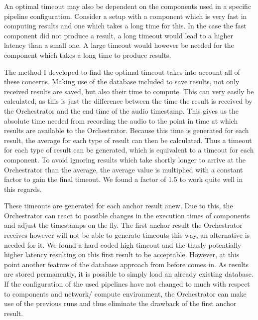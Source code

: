 An optimal timeout may also be dependent on the components used in a specific pipeline configuration.
Consider a setup with a component which is very fast in computing results and one which takes a long time for this.
In the case the fast component did not produce a result, a long timeout would lead to a higher latency than a small one.
A large timeout would however be needed for the component which takes a long time to produce results.

The method I developed to find the optimal timeout takes into account all of these concerns.
Making use of the database included to save results, not only received results are saved, but also their time to compute.
This can very easily be calculated, as this is just the difference between the time the result is received by the Orchestrator and the end time of the audio timestamp.
This gives us the absolute time needed from recording the audio to the point in time at which results are available to the Orchestrator.
Because this time is generated for each result, the average for each type of result can then be calculated.
Thus a timeout for each type of result can be generated, which is equivalent to a timeout for each component.
To avoid ignoring results which take shortly longer to arrive at the Orchestrator than the average, the average value is multiplied with a constant factor to gain the final timeout.
We found a factor of 1.5 to work quite well in this regards.

These timeouts are generated for each anchor result anew.
Due to this, the Orchestrator can react to possible changes in the execution times of components and adjust the timestamps on the fly.
The first anchor result the Orchestrator receives however will not be able to generate timeouts this way, an alternative is needed for it.
We found a hard coded high timeout and the thusly potentially higher latency resulting on this first result to be acceptable.
However, at this point another feature of the database approach from before comes in.
As results are stored permanently, it is possible to simply load an already existing database.
If the configuration of the used pipelines have not changed to much with respect to components and network/ compute environment, the Orchestrator can make use of the previous runs and thus eliminate the drawback of the first anchor result.


